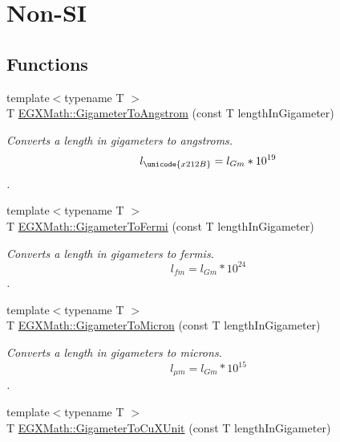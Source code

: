 \hypertarget{group___e_g_x_math-_conversions-_length_conversions-_gigameter-_non-_s_i}{}\section{Non-\/\+SI}
\label{group___e_g_x_math-_conversions-_length_conversions-_gigameter-_non-_s_i}
\subsection*{Functions}
\begin{DoxyCompactItemize}
\item 
{\footnotesize template$<$typename T $>$ }\\T \mbox{\hyperlink{group___e_g_x_math-_conversions-_length_conversions-_gigameter-_non-_s_i_ga622e85e3f663039f3802b29d25655989}{E\+G\+X\+Math\+::\+Gigameter\+To\+Angstrom}} (const T length\+In\+Gigameter)
\begin{DoxyCompactList}\small\item\em Converts a length in gigameters to angstroms. \[ l_{\unicode{x212B}}=l_{Gm} * 10^{19} \]. \end{DoxyCompactList}\item 
{\footnotesize template$<$typename T $>$ }\\T \mbox{\hyperlink{group___e_g_x_math-_conversions-_length_conversions-_gigameter-_non-_s_i_gadf6d730ad6e47bc8be214f3ef59b48ca}{E\+G\+X\+Math\+::\+Gigameter\+To\+Fermi}} (const T length\+In\+Gigameter)
\begin{DoxyCompactList}\small\item\em Converts a length in gigameters to fermis. \[ l_{fm}=l_{Gm} * 10^{24} \]. \end{DoxyCompactList}\item 
{\footnotesize template$<$typename T $>$ }\\T \mbox{\hyperlink{group___e_g_x_math-_conversions-_length_conversions-_gigameter-_non-_s_i_ga90426d22455e96b1f61e1850c7b89f77}{E\+G\+X\+Math\+::\+Gigameter\+To\+Micron}} (const T length\+In\+Gigameter)
\begin{DoxyCompactList}\small\item\em Converts a length in gigameters to microns. \[ l_{\mu m}=l_{Gm} * 10^{15} \]. \end{DoxyCompactList}\item 
{\footnotesize template$<$typename T $>$ }\\T \mbox{\hyperlink{group___e_g_x_math-_conversions-_length_conversions-_gigameter-_non-_s_i_gab542297b31676ef5b3cf62f0c63a6f20}{E\+G\+X\+Math\+::\+Gigameter\+To\+Cu\+X\+Unit}} (const T length\+In\+Gigameter)

\end{DoxyCompactItemize}
